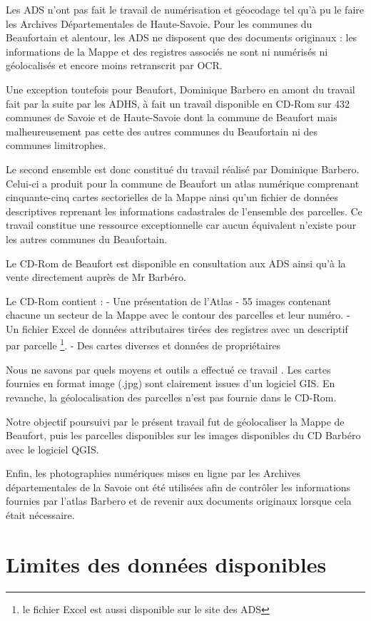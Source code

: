 \documentclass[12pt,a4paper]{report}
\begin{document}
Les ADS n’ont pas fait le travail de numérisation et géocodage tel qu’à pu le faire les Archives Départementales de Haute-Savoie. Pour les communes du Beaufortain et alentour, les ADS ne disposent que des documents originaux : les informations de la Mappe et des registres associés ne sont ni numérisés ni géolocalisés et encore moins retranscrit par OCR.

Une exception toutefois pour Beaufort, Dominique Barbero en amont du travail fait par la suite par les ADHS, à fait un travail disponible en CD-Rom sur 432 communes de Savoie et de Haute-Savoie dont la commune de Beaufort mais malheureusement pas cette des autres communes du Beaufortain ni des communes limitrophes.

Le second ensemble est donc constitué du travail réalisé par Dominique Barbero. Celui-ci a produit pour la commune de Beaufort un atlas numérique comprenant cinquante-cinq cartes sectorielles de la Mappe ainsi qu'un fichier de données descriptives reprenant les informations cadastrales de l'ensemble des parcelles. Ce travail constitue une ressource exceptionnelle car aucun équivalent n'existe pour les autres communes du Beaufortain.

Le CD-Rom de Beaufort est disponible en consultation aux ADS ainsi qu’à la vente directement auprès de Mr Barbéro.

Le CD-Rom contient : 
-	Une présentation de l’Atlas
-	55 images contenant chacune un secteur de la Mappe avec le contour des parcelles et leur numéro.
-	Un fichier Excel de données attributaires tirées des registres avec un descriptif par parcelle \footnote{le fichier Excel est aussi disponible sur le site des ADS}.
-	Des cartes diverses et données de propriétaires 

Nous ne savons par quels moyens et outils a effectué ce travail . Les cartes fournies en format image (.jpg) sont clairement issues d’un logiciel GIS. 
En revanche, la géolocalisation des parcelles n’est pas fournie dans le CD-Rom.

Notre objectif poursuivi par le présent travail fut  de géolocaliser la Mappe de Beaufort, puis les parcelles disponibles sur les images disponibles du CD Barbéro avec le logiciel QGIS. 

Enfin, les photographies numériques mises en ligne par les Archives départementales de la Savoie ont été utilisées afin de contrôler les informations fournies par l'atlas Barbero et de revenir aux documents originaux lorsque cela était nécessaire.

\section{Limites des données disponibles}
\end{document}
